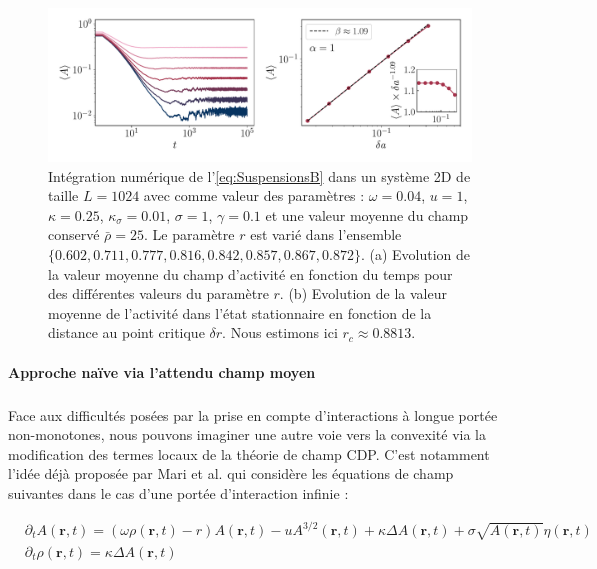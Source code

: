 \begin{figure}[h]
	\centering
	\includegraphics[width=\textwidth]{Chapitre5/Figures/SuspensionsB.pdf}
	\caption{Intégration numérique de l'\autoref{eq:SuspensionsB} dans un système 2D de taille $L=1024$ avec comme valeur des paramètres : $\omega = 0.04$, $u = 1$, $\kappa = 0.25$, $\kappa_\sigma = 0.01$, $\sigma = 1$, $\gamma = 0.1$ et une valeur moyenne du champ conservé $\bar{\rho} = 25$. Le paramètre $r$ est varié dans l'ensemble $\{ 0.602, 0.711, 0.777, 0.816, 0.842, 0.857, 0.867, 0.872\}$. (a) Evolution de la valeur moyenne du champ d'activité en fonction du temps pour des différentes valeurs du paramètre $r$. (b) Evolution de la valeur moyenne de l'activité dans l'état stationnaire en fonction de la distance au point critique $\delta r$. Nous estimons ici $r_c \approx 0.8813$.}
	\label{fig:SuspensionsB}
\end{figure}

\paragraph{Approche naïve via l'attendu champ moyen}

\subparagraph{}Face aux difficultés posées par la prise en compte d'interactions à longue portée non-monotones, nous pouvons imaginer une autre voie vers la convexité via la modification des termes locaux de la théorie de champ CDP. C'est notamment l'idée déjà proposée par Mari et al. \cite{mari_absorbing_2022} qui considère les équations de champ suivantes dans le cas d'une portée d'interaction infinie :

\begin{equation}
\begin{aligned}
	&\partial_t A(\mathbf{r}, t) = (\omega\rho (\mathbf{r}, t) - r)A(\mathbf{r}, t) - uA^{3/2}(\mathbf{r}, t) + \kappa\Delta A (\mathbf{r}, t) + \sigma \sqrt{A(\mathbf{r}, t)} \eta(\mathbf{r}, t)\\
	&\partial_t \rho (\mathbf{r}, t) = \kappa\Delta A (\mathbf{r}, t)
\end{aligned}
\label{eq:CDP32}
\end{equation}

